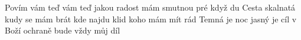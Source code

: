 \begin{TEXT}{Povím vám teď}
\SLOKA {} vám teď jakou radost mám \NL
smutnou pré  když du   
\SLOKA Cesta skalnatá kudy se mám brát \NL
kde najdu klid koho mám mít rád 
\SLOKA Temná je noc jasný je cíl \NL
v Boží ochraně bude vždy můj díl 
\end{TEXT}
